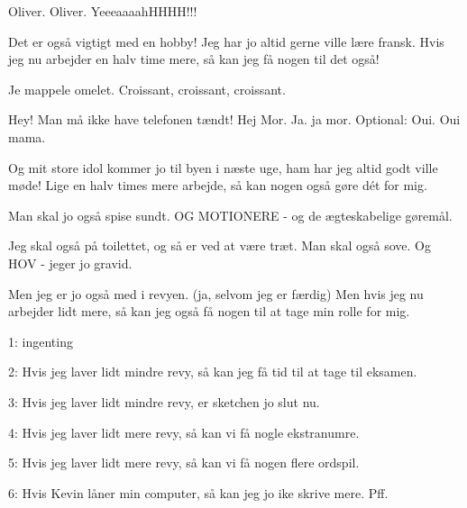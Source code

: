 \documentclass[a4paper,11pt]{article}
\begin{document}
\begin{sketch}

 Oliver. Oliver. YeeeaaaahHHHH!!!

 Det er også vigtigt med en hobby! Jeg har jo altid gerne ville lære fransk. Hvis jeg nu arbejder en halv time mere, så kan jeg få nogen til det også!


 Je mappele omelet. Croissant, croissant, croissant.

 Hey! Man må ikke have telefonen tændt!
 Hej Mor. Ja. ja mor.
 Optional: Oui. Oui mama.

 Og mit store idol kommer jo til byen i næste uge, ham har jeg altid godt ville møde! Lige en halv times mere arbejde, så kan nogen også gøre dét for mig.




 Man skal jo også spise sundt. OG MOTIONERE - og de ægteskabelige gøremål.


 Jeg skal også på toilettet, og så er ved at være træt. Man skal også sove. Og HOV - jeger jo gravid.

 Men jeg er jo også med i revyen. (ja, selvom jeg er færdig) Men hvis jeg nu arbejder lidt mere, så kan jeg også få nogen til at tage min rolle for mig.


1: ingenting

2: Hvis jeg laver lidt mindre revy, så kan jeg få tid til at tage til eksamen.

3: Hvis jeg laver lidt mindre revy, er sketchen jo slut nu.

4: Hvis jeg laver lidt mere revy, så kan vi få nogle ekstranumre.

5: Hvis jeg laver lidt mere revy, så kan vi få nogen flere ordspil.

6: Hvis Kevin låner min computer, så kan jeg jo ike skrive mere. Pff.
\end{sketch}
\end{document}
